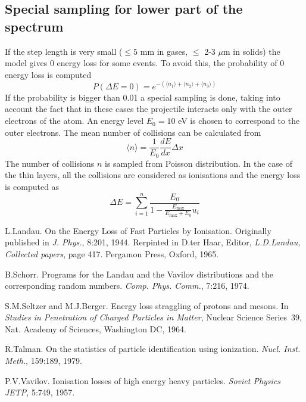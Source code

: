 \documentclass{article}
\newcommand{\Emax}{\ensuremath{E_{\mathrm{max}}}}
\begin{document}
\subsection{Special sampling for lower part of the spectrum}

If the step length is very small ($\leq 5$ mm in gases, $\leq$ 2-3
$\mu$m in solids) the model gives 0 energy loss for some events.  To
avoid this, the probability of 0 energy loss is computed
\begin{equation}
P( \Delta E=0) = e^{-( \langle n_1 \rangle + \langle n_2 \rangle
                     + \langle n_3 \rangle )}
\end{equation}
If the probability is bigger than 0.01 a special sampling is done,
taking into account the fact that in these cases the projectile
interacts only with the outer electrons of the atom.  An energy level
$E_0 = 10$ eV is chosen to correspond to the outer electrons. The mean
number of collisions can be calculated from
\begin{equation}
\langle n \rangle = \frac{1}{E_0} \frac{dE}{dx} \Delta x
\end{equation}
The number of collisions $n$ is sampled from Poisson distribution.
In the case of the thin layers, all the collisions are considered as
ionisations and the energy loss is computed as
\begin{equation}
\Delta E = \sum_{i=1}^n \frac{E_0}
          {1 - \frac {\Emax}{\Emax + E_0} u_i}
\end{equation}


\begin{thebibliography}{10}
L.Landau.
\newblock On the Energy Loss of Fast Particles by Ionisation.
\newblock Originally published in \emph{J. Phys.}, 8:201, 1944.
\newblock Rerpinted in D.ter Haar, Editor, \emph{L.D.Landau, Collected
  papers}, page 417.  Pergamon Press, Oxford, 1965.

B.Schorr.
\newblock Programs for the Landau and the Vavilov distributions and the
  corresponding random numbers.
\newblock \emph{Comp. Phys. Comm.}, 7:216, 1974.

S.M.Seltzer and M.J.Berger.
\newblock Energy loss straggling of protons and mesons. 
\newblock In \emph{Studies in Penetration of Charged Particles in
  Matter}, Nuclear Science Series~39, Nat. Academy of Sciences,
  Washington DC, 1964.

R.Talman.
\newblock On the statistics of particle identification using ionization.
\newblock \emph{Nucl. Inst. Meth.}, 159:189, 1979.

P.V.Vavilov.
\newblock Ionisation losses of high energy heavy particles.
\newblock \emph{Soviet Physics JETP}, 5:749, 1957.

\end{thebibliography}
\end{document}
